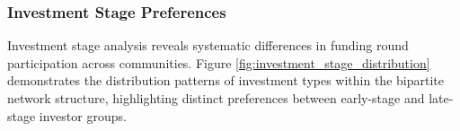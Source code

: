 \documentclass[12pt]{article}
\begin{document}


\subsubsection{Investment Stage Preferences}

Investment stage analysis reveals systematic differences in funding round participation across communities. Figure \ref{fig:investment_stage_distribution} demonstrates the distribution patterns of investment types within the bipartite network structure, highlighting distinct preferences between early-stage and late-stage investor groups.
\end{document}
